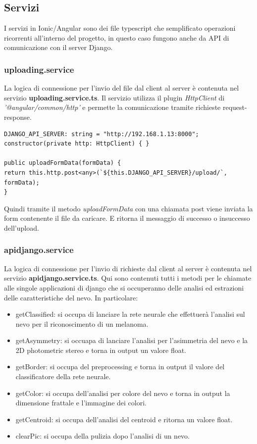 {\subsection{Servizi}
I servizi in Ionic/Angular sono dei file typescript che semplificato operazioni ricorrenti all'interno del progetto, in questo caso fungono anche da API di comunicazione con il server Django.
\subsubsection{uploading.service}
La logica di connessione per l'invio del file dal client al server è contenuta nel servizio \textbf{uploading.service.ts}.
Il servizio utilizza il plugin \textit{HttpClient} di \textit{'@angular/common/http'} e permette la comunicazione tramite richieste request-response.
\begin{lstlisting}
DJANGO_API_SERVER: string = "http://192.168.1.13:8000";
constructor(private http: HttpClient) { }

public uploadFormData(formData) {
return this.http.post<any>(`${this.DJANGO_API_SERVER}/upload/`, formData);
}
\end{lstlisting}
Quindi tramite il metodo \textit{uploadFormData} con una chiamata post viene inviata la form contenente il file da caricare. E ritorna il messaggio di successo o insuccesso dell'upload.
\subsubsection{apidjango.service}
La logica di connessione per l'invio di richieste dal client al server è contenuta nel servizio \textbf{apidjango.service.ts}.
Qui sono contenuti tutti i metodi per le chiamate alle singole applicazioni di django che si occuperanno delle analisi ed estrazioni delle caratteristiche del nevo.
In particolare:
\begin{itemize}
	\item getClassified: si occupa di lanciare la rete neurale che effettuerà l'analisi sul nevo per il riconoscimento di un melanoma.
	\item getAsymmetry: si occuapa di lanciare l'analisi per l'asimmetria del nevo e la 2D photometric stereo e torna in output un valore float.
	\item getBorder: si occupa del preprocessing e torna in output il valore del classificatore della rete neurale.
	\item getColor: si occupa dell'analisi per colore del nevo e torna in output la dimensione frattale e l'immagine dei colori.
	\item getCentroid: si occupa dell'analisi del centroid e ritorna un valore float.
	\item clearPic: si occupa della pulizia dopo l'analisi di un nevo. 
\end{itemize}
\newpage
}
